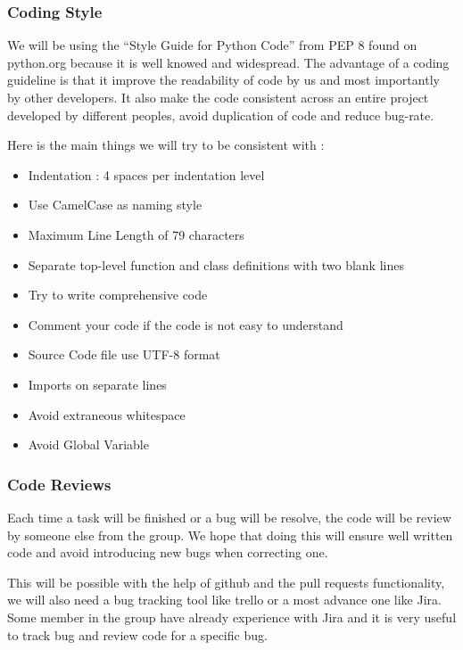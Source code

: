 \documentclass[11pt, a4paper]{article}   	%
\begin{document}
\subsubsection{Coding Style}
	
We will be using the \enquote{Style Guide for Python Code} from PEP 8 found on python.org because it is well knowed and widespread. 
The advantage of a coding guideline is that it improve the readability of code by us and most importantly by other developers. 
It also make the code consistent across an entire project developed by different peoples, avoid duplication of code and reduce bug-rate. 
 
Here is the main things we will try to be consistent with : 

\begin{itemize}
\item Indentation : 4 spaces per indentation level
\item Use CamelCase as naming style
\item Maximum Line Length of 79 characters
\item Separate top-level function and class definitions with two blank lines
\item Try to write comprehensive code
\item Comment your code if the code is not easy to understand
\item Source Code file use UTF-8 format
\item Imports on separate lines
\item Avoid extraneous whitespace
\item Avoid Global Variable
\end{itemize} 


\subsubsection{Code Reviews}
	
Each time a task will be finished or a bug will be resolve, the code will be review by someone else from the group. 
We hope that doing this will ensure well written code and avoid introducing new bugs when correcting one.  
 
This will be possible with the help of github and the pull requests functionality, we will also need a bug tracking tool like trello or a most advance one like Jira. Some member in the group have already experience with Jira and it is very useful to track bug and review code for a specific bug. 
 
\end{document}
